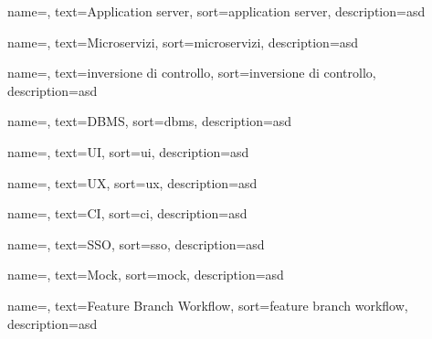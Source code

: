 {
    name=,
    text=Application server,
    sort=application server,
    description=asd
}

{
    name=,
    text=Microservizi,
    sort=microservizi,
    description=asd
}

{
    name=,
    text=inversione di controllo,
    sort=inversione di controllo,
    description=asd
}

{
    name=,
    text=DBMS,
    sort=dbms,
    description=asd
}

{
    name=,
    text=UI,
    sort=ui,
    description=asd
}

{
    name=,
    text=UX,
    sort=ux,
    description=asd
}

{
    name=,
    text=CI,
    sort=ci,
    description=asd
}

{
    name=,
    text=SSO,
    sort=sso,
    description=asd
}

{
    name=,
    text=Mock,
    sort=mock,
    description=asd
}

{
    name=,
    text=Feature Branch Workflow,
    sort=feature branch workflow,
    description={asd}
}